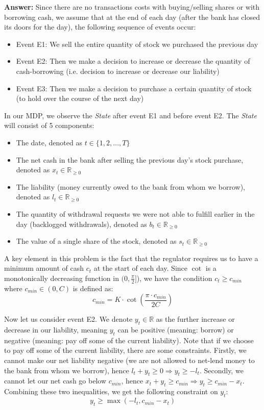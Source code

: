\documentclass[12pt]{exam}
\begin{document}
\begin{questions}
{\bf Answer: } Since there are no transactions costs with buying/selling shares or with borrowing cash, we assume that at the end of each day (after the bank has closed its doors for the day), the following sequence of events occur:
\begin{itemize}
\item Event E1: We sell the entire quantity of stock we purchased the previous day
\item Event E2: Then we make a decision to increase or decrease the quantity of cash-borrowing (i.e. decision to increase or decrease our liability)
\item Event E3: Then we make a decision to purchase a certain quantity of stock (to hold over the course of the next day)
\end{itemize}
In our MDP, we observe the {\em State} after event E1 and before event E2. The {\em State} will consist of 5 components:
\begin{itemize}
\item The date, denoted as $t \in \{1, 2, \ldots, T\}$
\item The net cash in the bank after selling the previous day's stock purchase, denoted as $x_t \in \mathbb{R}_{\geq 0}$
\item The liability (money currently owed to the bank from whom we borrow), denoted as $l_t \in \mathbb{R}_{\geq 0}$
\item The quantity of withdrawal requests we were not able to fulfill earlier in the day (backlogged withdrawals), denoted as $b_t \in \mathbb{R}_{\geq 0}$
\item The value of a single share of the stock, denoted as $s_t \in \mathbb{R}_{\geq 0}$
\end{itemize}

A key element in this problem is the fact that the regulator requires us to have a minimum amount of cash $c_t$ at the start of each day. Since $\cot$ is a monotonically decreasing function in $(0, \frac {\pi} 2]$), we have the condition $c_t \geq c_{min}$ where $c_{min} \in (0, C)$ is defined as:
$$c_{min} = K\cdot \cot(\frac {\pi \cdot c_{min}} {2C})$$

Now let us consider event E2. We denote $y_t \in \mathbb{R}$ as the further increase or decrease in our liability, meaning $y_t$ can be positive (meaning: borrow) or negative (meaning: pay off some of the current liability). Note that if we choose to pay off some of the current liability, there are some constraints. Firstly, we cannot make our net liability negative (we are not allowed to net-lend money to the bank from whom we borrow), hence $l_t + y_t \geq 0 \Rightarrow y_t \geq -l_t$. Secondly, we cannot let our net cash go below $c_{min}$, hence $x_t + y_t \geq c_{min} \Rightarrow y_t \geq c_{min} - x_t$. Combining these two inequalities, we get the following constraint on $y_t$:
$$y_t \geq \max(-l_t, c_{min} - x_t)$$


\end{questions}
\end{document}
